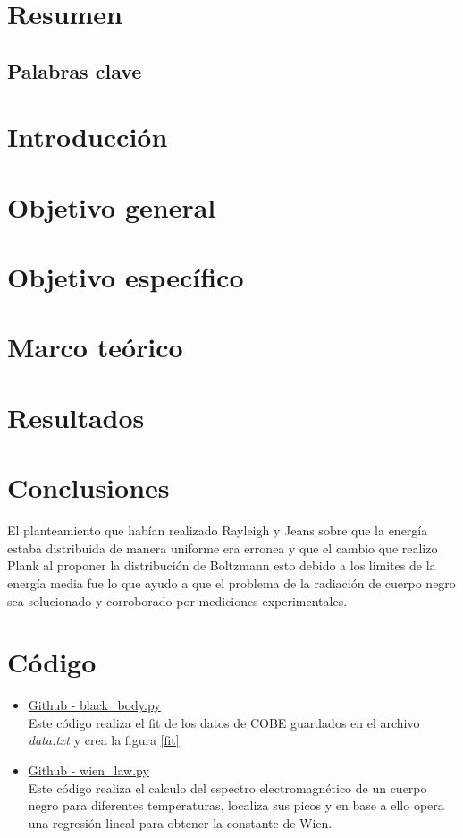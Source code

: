 \documentclass[12pt,letterpaper]{article}
\begin{document}
\begin{multicols}{2}
\section*{Resumen}
\subsection*{Palabras clave}
\section*{Introducción}
\section*{Objetivo general}
\section*{Objetivo específico}
\section*{Marco teórico}
\section*{Resultados}
\section*{Conclusiones}
El planteamiento que habían realizado Rayleigh y Jeans sobre que la energía estaba distribuida de manera uniforme era erronea y que el cambio que realizo Plank al proponer la distribución de Boltzmann esto debido a los limites de la energía media fue lo que ayudo a que el problema de la radiación de cuerpo negro sea solucionado y corroborado por mediciones experimentales.
\section*{Código}
\begin{itemize}
\item \href{https://github.com/giovannilopez9808/Notas_Agosto_2020/blob/master/AMC/Reto1/black_body.py}{Github - black\_body.py}\\
Este código realiza el fit de los datos de COBE guardados en el archivo  \textit{data.txt} y crea la figura \ref{fit}
\item \href{https://github.com/giovannilopez9808/Notas_Agosto_2020/blob/master/AMC/Reto1/wien_law.py}{Github - wien\_law.py}\\
Este código realiza el calculo del espectro electromagnético de un cuerpo negro para diferentes temperaturas, localiza sus picos y en base a ello opera una regresión lineal para obtener la constante de Wien.
\end{itemize}


\nocite{*}
\end{multicols}
\end{document}
